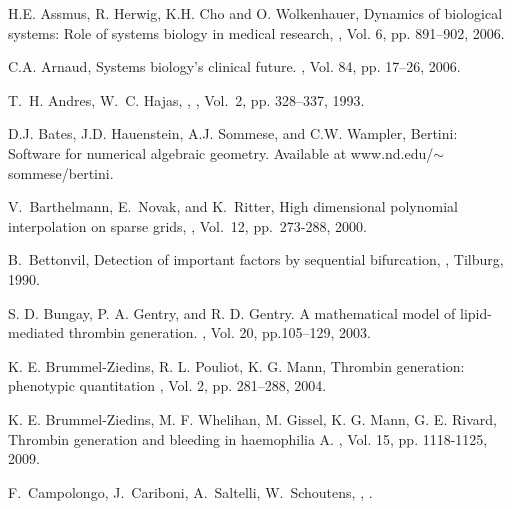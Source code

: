 \def\CTeXPreproc{Created by ctex v0.2.11, don't edit!}\begin{thebibliography}{99}

\newblock H.E. Assmus, R. Herwig, K.H. Cho and O. Wolkenhauer,
\newblock Dynamics of biological systems: Role of systems biology in medical research,
, Vol. 6, pp. 891--902, 2006.

\newblock C.A. Arnaud,
\newblock Systems biology's clinical future.
, Vol. 84, pp. 17--26, 2006.


\newblock T.~H. Andres, W.~C. Hajas, ,  , Vol.~2, pp. 328--337, 1993.

{ D.J. Bates, J.D. Hauenstein, A.J. Sommese, and C.W. Wampler,}
Bertini: Software for numerical algebraic geometry. Available at
www.nd.edu/$\sim$sommese/bertini.

V.~Barthelmann, E.~Novak, and K.~Ritter, \newblock High dimensional
polynomial interpolation on sparse grids, , Vol.~12,  pp.~273-288, 2000.

\newblock B.~Bettonvil, \newblock Detection of important factors by sequential bifurcation, , Tilburg, 1990.

S. D. Bungay, P. A. Gentry, and R. D. Gentry. \newblock A
mathematical model of lipid-mediated thrombin generation.
, Vol. 20, pp.105--129, 2003.

K. E. Brummel-Ziedins, R. L. Pouliot, K. G. Mann, \newblock Thrombin
generation: phenotypic quantitation , Vol. 2,  pp. 281--288, 2004.

K. E. Brummel-Ziedins, M. F. Whelihan, M. Gissel, K. G. Mann, G. E.
Rivard, \newblock Thrombin generation and bleeding in haemophilia A.
, Vol. 15, pp. 1118-1125, 2009.

\newblock F.~Campolongo, J.~Cariboni, A.~Saltelli, W.~Schoutens, , .



\end{thebibliography}
